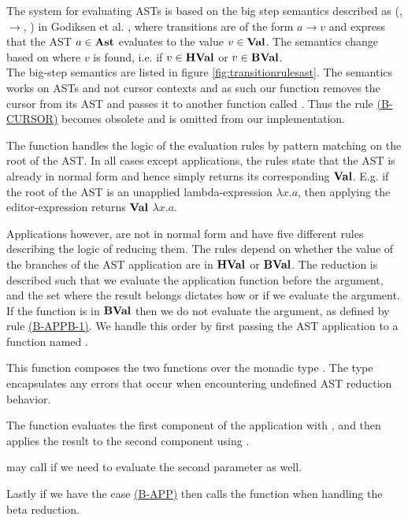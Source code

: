 The system for evaluating ASTs is based on the big step semantics described as
(\AST, $\to$, \val) in Godiksen et al. \pepm, where transitions are of the form
$a \to v$ and express that the AST $a \in \textbf{Ast}$ evaluates to the value $v \in
\textbf{Val}$. The semantics change based on where $v$ is found, i.e. if $v \in \textbf{HVal}$
or $v \in \textbf{BVal}$. \\

The big-step semantics are listed in figure \ref{fig:transitionrulesast}. The
semantics works on ASTs and not cursor contexts and as such our 
function removes the cursor from its AST and passes it to another function
called . Thus the rule
\hyperref[fig:transitionrulesast]{(B-CURSOR)} becomes obsolete and is omitted
from our implementation.

The function  handles the logic of the evaluation rules by pattern
matching on the root of the AST. In all cases except applications, the rules
state that the AST is already in normal form and hence simply returns its
corresponding $\textbf{Val}$. E.g. if the root of the AST is an unapplied
lambda-expression $\lambda x . a$, then applying the editor-expression
 returns $\textbf{Val}$ $\lambda x . a$.

Applications however, are not in normal form and have five different rules
describing the logic of reducing them. The rules depend on whether the value of
the branches of the AST application are in $\textbf{HVal}$ or $\textbf{BVal}$. The reduction is
described such that we evaluate the application function before the argument,
and the set where the result belongs dictates how or if we evaluate the
argument. If the function is in $\textbf{BVal}$ then we do not evaluate the argument, as
defined by rule \hyperref[fig:transitionrulesast]{(B-APPB-1)}. We handle this
order by first passing the AST application to a function named .

This function composes the two functions over the monadic type . The
 type encapsulates any errors that occur when encountering undefined
AST reduction behavior.

The function evaluates the first component of the application with
, and then applies the result to the second component using
.

 may call  if we need to evaluate the second
parameter as well.

Lastly if we have the case \hyperref[fig:transitionrulesast]{(B-APP)} then
 calls the function  when handling the beta
reduction.

